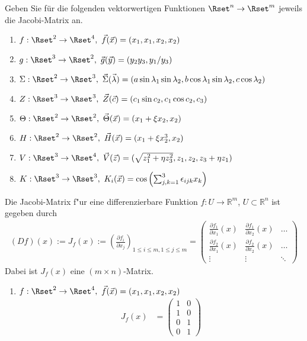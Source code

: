 \documentclass[11pt,answers]{exam}
\begin{document}
\begin{questions}
Geben Sie für die folgenden vektorwertigen Funktionen $\Rset^n\to\Rset^m$ jeweils die Jacobi-Matrix an. %
\begin{enumerate}
\item $f:\Rset^2\to\Rset^4,~\vec{f}(\vec{x})=(x_1,x_1,x_2,x_2)$
\item $g:\Rset^3\to\Rset^2,~\vec{g}(\vec{y})=(y_2y_3,y_1/y_3)$
\item $\Sigma:\Rset^2\to\Rset^3,~\vec{\Sigma}(\vec{\lambda})=(a\sin\lambda_1\sin\lambda_2,b\cos\lambda_1\sin\lambda_2,c\cos\lambda_2)$
\item $Z:\Rset^3\to\Rset^3,~\vec{Z}(\vec{c})=(c_1\sin c_2,c_1\cos c_2,c_3)$
\item $\Theta:\Rset^2\to\Rset^2,~\vec{\Theta}(\vec{x})=(x_1+\xi x_2,x_2)$
\item $H:\Rset^2\to\Rset^2,~\vec{H}(\vec{x})=(x_1+\xi x_2^3,x_2)$
\item $V:\Rset^3\to\Rset^4,~\vec{V}(\vec{z})=(\sqrt{z_1^2+\eta z_3^2},z_1,z_2,z_3+\eta z_1)$
\item $K:\Rset^3\to\Rset^3,~K_i(\vec{x})=\cos\left(\sum_{j,k=1}^3\epsilon_{ijk}x_k\right)$
\end{enumerate}
\begin{solution} Die Jacobi-Matrix f"ur eine differenzierbare
Funktion $f:U\to\mathbb{R}^m$, $U\subset\mathbb{R}^n$ ist gegeben durch
\begin{align*}
(Df)(x):=J_f(x):=\left(\frac{\partial f_i}{\partial x_j}\right)_{1\leq i\leq m, 1\leq j\leq m}
=
\begin{pmatrix}
\frac{\partial f_1}{\partial x_1}(x) & \frac{\partial f_1}{\partial x_2}(x) & \dots
\\
\frac{\partial f_2}{\partial x_1}(x) & \frac{\partial f_2}{\partial x_2}(x) & \dots
\\
\vdots & \vdots & \ddots
\end{pmatrix}
\end{align*}
Dabei ist $J_f(x)$ eine $(m\times n)$-Matrix.
\begin{enumerate}
\item $f:\Rset^2\to\Rset^4,~\vec{f}(\vec{x})=(x_1,x_1,x_2,x_2)$
\begin{align*}
J_f(x)&=\begin{pmatrix}
1&0 \\
1&0 \\
0&1 \\
0&1
\end{pmatrix}
\end{align*}

\end{enumerate}
\end{solution}
\end{questions}
\end{document}
